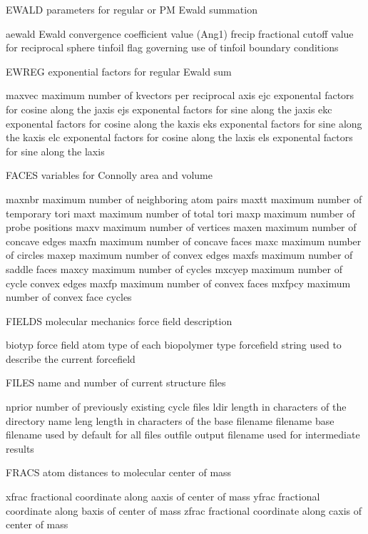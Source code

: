 \documentclass[letterpaper,11pt,english]{sphinxmanual}
\begin{document}
EWALD   parameters for regular or PM Ewald summation

aewald  Ewald convergence coefficient value (Ang\sphinxhyphen{}1)
frecip  fractional cutoff value for reciprocal sphere
tinfoil flag governing use of tinfoil boundary conditions

EWREG   exponential factors for regular Ewald sum

maxvec  maximum number of k\sphinxhyphen{}vectors per reciprocal axis
ejc     exponental factors for cosine along the j\sphinxhyphen{}axis
ejs     exponental factors for sine along the j\sphinxhyphen{}axis
ekc     exponental factors for cosine along the k\sphinxhyphen{}axis
eks     exponental factors for sine along the k\sphinxhyphen{}axis
elc     exponental factors for cosine along the l\sphinxhyphen{}axis
els     exponental factors for sine along the l\sphinxhyphen{}axis

FACES   variables for Connolly area and volume

maxnbr  maximum number of neighboring atom pairs
maxtt   maximum number of temporary tori
maxt    maximum number of total tori
maxp    maximum number of probe positions
maxv    maximum number of vertices
maxen   maximum number of concave edges
maxfn   maximum number of concave faces
maxc    maximum number of circles
maxep   maximum number of convex edges
maxfs   maximum number of saddle faces
maxcy   maximum number of cycles
mxcyep  maximum number of cycle convex edges
maxfp   maximum number of convex faces
mxfpcy  maximum number of convex face cycles

FIELDS  molecular mechanics force field description

biotyp  force field atom type of each biopolymer type
forcefield      string used to describe the current forcefield

FILES   name and number of current structure files

nprior  number of previously existing cycle files
ldir    length in characters of the directory name
leng    length in characters of the base filename
filename        base filename used by default for all files
outfile output filename used for intermediate results

FRACS   atom distances to molecular center of mass

xfrac   fractional coordinate along a\sphinxhyphen{}axis of center of mass
yfrac   fractional coordinate along b\sphinxhyphen{}axis of center of mass
zfrac   fractional coordinate along c\sphinxhyphen{}axis of center of mass
\end{document}
